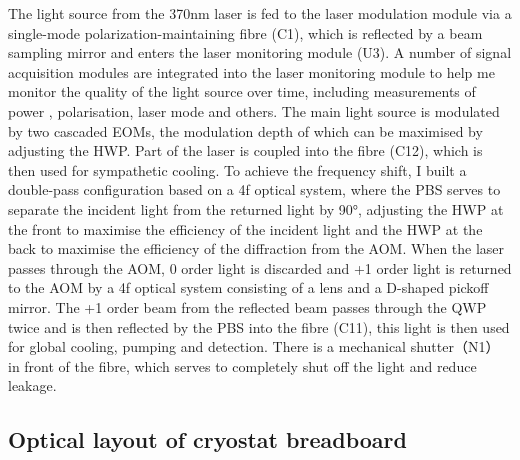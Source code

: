 The light source from the 370nm laser is fed to the laser modulation module via a single-mode polarization-maintaining fibre (C1), which is reflected by a beam sampling mirror and enters the laser monitoring module (U3). A number of signal acquisition modules are integrated into the laser monitoring module to help me monitor the quality of the light source over time, including measurements of power , polarisation, laser mode and others. The main light source is modulated by two cascaded EOMs, the modulation depth of which can be maximised by adjusting the HWP. Part of the laser is coupled into the fibre (C12), which is then used for sympathetic cooling. To achieve the frequency shift, I built a double-pass configuration based on a 4f optical system, where the PBS serves to separate the incident light from the returned light by 90°, adjusting the HWP at the front to maximise the efficiency of the incident light and the HWP at the back to maximise the efficiency of the diffraction from the AOM. When the laser passes through the AOM, 0 order light is discarded and +1 order light is returned to the AOM by a 4f optical system consisting of a lens and a D-shaped pickoff mirror. The +1 order beam from the reflected beam passes through the QWP twice and is then reflected by the PBS into the fibre (C11), this light is then used for global cooling, pumping and detection. There is a mechanical shutter（N1） in front of the fibre, which serves to completely shut off the light and reduce leakage.

\subsection{Optical layout of cryostat breadboard}

